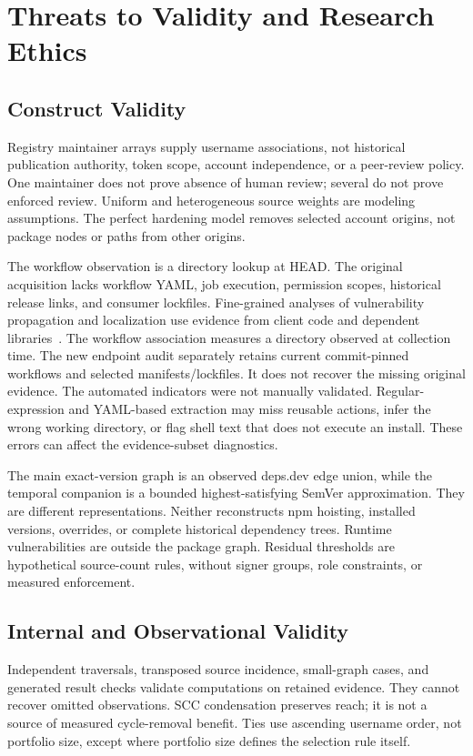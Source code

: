 \section{Threats to Validity and Research Ethics}
\label{sec:threats_to_validity}
\subsection{Construct Validity}
Registry maintainer arrays supply username associations, not historical publication authority, token scope, account independence, or a peer-review policy. One maintainer does not prove absence of human review; several do not prove enforced review. Uniform and heterogeneous source weights are modeling assumptions. The perfect hardening model removes selected account origins, not package nodes or paths from other origins.

The workflow observation is a directory lookup at HEAD. The original acquisition lacks workflow YAML, job execution, permission scopes, historical release links, and consumer lockfiles. Fine-grained analyses of vulnerability propagation and localization use evidence from client code and dependent libraries~\cite{gao2025emse}. The workflow association measures a directory observed at collection time.
The new endpoint audit separately retains current commit-pinned workflows and selected manifests/lockfiles. It does not recover the missing original evidence. The automated indicators were not manually validated. Regular-expression and YAML-based extraction may miss reusable actions, infer the wrong working directory, or flag shell text that does not execute an install. These errors can affect the evidence-subset diagnostics.

The main exact-version graph is an observed deps.dev edge union, while the temporal companion is a bounded highest-satisfying SemVer approximation. They are different representations. Neither reconstructs npm hoisting, installed versions, overrides, or complete historical dependency trees. Runtime vulnerabilities are outside the package graph. Residual thresholds are hypothetical source-count rules, without signer groups, role constraints, or measured enforcement.

\subsection{Internal and Observational Validity}
Independent traversals, transposed source incidence, small-graph cases, and generated result checks validate computations on retained evidence. They cannot recover omitted observations. SCC condensation preserves reach; it is not a source of measured cycle-removal benefit. Ties use ascending username order, not portfolio size, except where portfolio size defines the selection rule itself.

